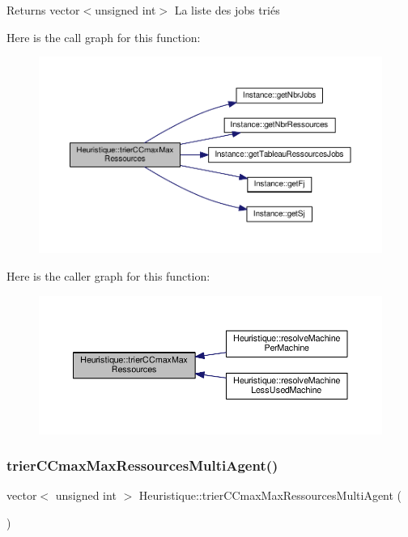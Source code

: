 \begin{DoxyReturn}{Returns}
vector$<$unsigned int$>$ La liste des jobs triés 
\end{DoxyReturn}
Here is the call graph for this function\+:
\nopagebreak
\begin{figure}[H]
\begin{center}
\leavevmode
\includegraphics[width=350pt]{classHeuristique_a02aae5127f941e55311e8bbd3b4afd3c_cgraph}
\end{center}
\end{figure}
Here is the caller graph for this function\+:
\nopagebreak
\begin{figure}[H]
\begin{center}
\leavevmode
\includegraphics[width=350pt]{classHeuristique_a02aae5127f941e55311e8bbd3b4afd3c_icgraph}
\end{center}
\end{figure}
\mbox{\label{classHeuristique_a177908d75131594fb1a37bd1a5b795f0}} 
\subsubsection{\texorpdfstring{trier\+C\+Cmax\+Max\+Ressources\+Multi\+Agent()}{trierCCmaxMaxRessourcesMultiAgent()}}
{\footnotesize\ttfamily vector$<$ unsigned int $>$ Heuristique\+::trier\+C\+Cmax\+Max\+Ressources\+Multi\+Agent (\begin{DoxyParamCaption}{ }\end{DoxyParamCaption})}



